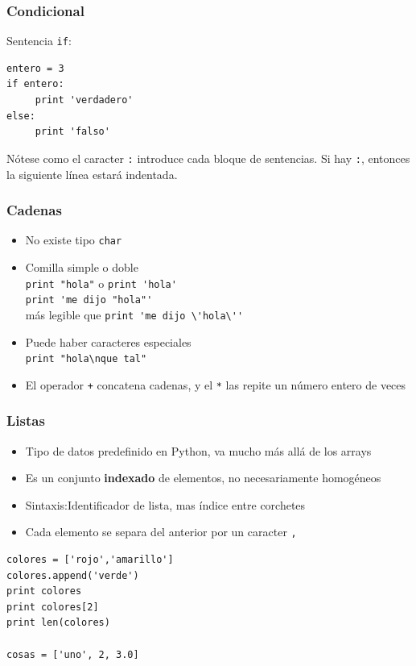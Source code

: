 \documentclass{beamer}
\begin{document}
\begin{frame}[fragile]
\frametitle{Condicional}

Sentencia \verb|if|:

\begin{footnotesize}
\begin{verbatim}
entero = 3
if entero:
     print 'verdadero'
else:
     print 'falso'
\end{verbatim}
\end{footnotesize}
Nótese como el caracter \verb|:| introduce cada bloque de sentencias. Si hay \verb|:|, entonces la siguiente línea estará indentada.
\end{frame}



\begin{frame}[fragile]
\frametitle{Cadenas}

\begin{itemize}
\item No existe tipo \verb|char|
\item 
Comilla simple o doble \\
\verb|print "hola"|  o \verb|print 'hola'|  \\
\verb|print 'me dijo "hola"'| \\
más legible que \verb|print 'me dijo \'hola\''|
\item 
Puede haber caracteres especiales\\
\verb|print "hola\nque tal"|   

\item El operador \verb|+| concatena cadenas, y el \verb|*| las repite
  un número entero de veces
\end{itemize}
\end{frame}


\begin{frame}[fragile]
\frametitle{Listas}

\begin{itemize}
\item Tipo de datos predefinido en Python, va mucho más allá de los
  arrays
\item Es un conjunto {\bf indexado} de elementos, no necesariamente homogéneos
\item Sintaxis:Identificador de lista, mas índice entre corchetes
\item Cada elemento se separa del anterior por un caracter \verb|,|
\end{itemize}
  \begin{footnotesize}
\begin{verbatim}
colores = ['rojo','amarillo']
colores.append('verde')
print colores
print colores[2]
print len(colores)

cosas = ['uno', 2, 3.0]

\end{verbatim}
  \end{footnotesize}

\end{frame}
\end{document}
